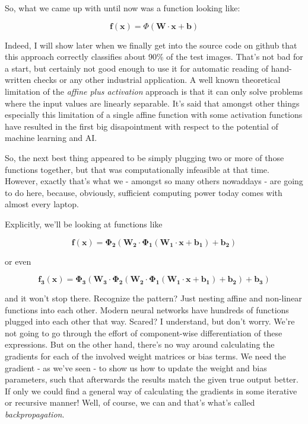 \documentclass[]{report}
\begin{document}
So, what we came up with until now was a function looking like:

\begin{equation}
\mathbf{f}(\mathbf{x})=\Phi(\mathbf{W} \cdot \mathbf{x} + \mathbf{b})
\end{equation}

Indeed, I will show later when we finally get into the source code on github that this approach correctly classifies about 90\% of the test images. That's not bad for a start, but certainly not good enough to use it for automatic reading of hand-written checks or any other industrial application. A well known theoretical limitation of the \emph{affine plus activation} approach is that it can only solve problems where the input values are linearly separable. It's said that amongst other things especially this limitation of a single affine function with some activation functions have resulted in the first big disapointment with respect to the potential of machine learning and AI.

So, the next best thing appeared to be simply plugging two or more of those functions together, but that was computationally infeasible at that time. However, exactly that's what we - amongst so many others nowaddays - are going to do here, because, obviously, sufficient computing power today comes with almost every laptop.

Explicitly, we'll be looking at functions like

\begin{equation}
\mathbf{f}(\mathbf{x})=\mathbf{\Phi_2}(\mathbf{W_2} \cdot \mathbf{\Phi_1(\mathbf{W_1} \cdot \mathbf{x} + \mathbf{b_1})} + \mathbf{b_2})
\end{equation}

or even

\begin{equation} \label{eq:300}
\mathbf{f_3}(\mathbf{x})=\mathbf{\Phi_3}(\mathbf{W_3} \cdot \mathbf{\Phi_2(\mathbf{W_2} \cdot \mathbf{\Phi_1(\mathbf{W_1} \cdot \mathbf{x} + \mathbf{b_1})} + \mathbf{b_2})} + \mathbf{b_3}) 
\end{equation}

and it won't stop there. Recognize the pattern? Just nesting affine and non-linear functions into each other. Modern neural networks have hundreds of functions plugged into each other that way. Scared? I understand, but don't worry. We're not going to go through the effort of component-wise differentiation of these expressions. But on the other hand, there's no way around calculating the gradients for each of the involved weight matrices or bias terms. We need the gradient - as we've seen - to show us how to update the weight and bias parameters, such that afterwards the results match the given true output better. If only we could find a general way of calculating the gradients in some iterative or recursive manner! Well, of course, we can and that's what's called \emph{backpropagation}.
\end{document}
